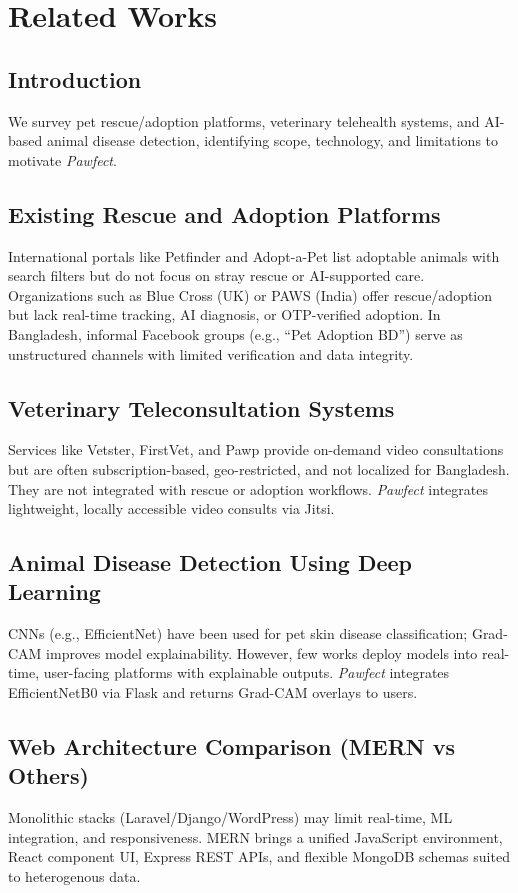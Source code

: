\documentclass[12pt,a4paper]{report}
\numberwithin{figure}{chapter}
\numberwithin{table}{chapter}
\begin{document}
\chapter{Related Works}\label{chap:related}

\section{Introduction}
We survey pet rescue/adoption platforms, veterinary telehealth systems, and AI-based animal disease detection, identifying scope, technology, and limitations to motivate \textit{Pawfect}.

\section{Existing Rescue and Adoption Platforms}
International portals like Petfinder and Adopt-a-Pet list adoptable animals with search filters but do not focus on stray rescue or AI-supported care. Organizations such as Blue Cross (UK) or PAWS (India) offer rescue/adoption but lack real-time tracking, AI diagnosis, or OTP-verified adoption. In Bangladesh, informal Facebook groups (e.g., ``Pet Adoption BD'') serve as unstructured channels with limited verification and data integrity.

\section{Veterinary Teleconsultation Systems}
Services like Vetster, FirstVet, and Pawp provide on-demand video consultations but are often subscription-based, geo-restricted, and not localized for Bangladesh. They are not integrated with rescue or adoption workflows. \textit{Pawfect} integrates lightweight, locally accessible video consults via Jitsi.

\section{Animal Disease Detection Using Deep Learning}
CNNs (e.g., EfficientNet) have been used for pet skin disease classification; Grad-CAM improves model explainability. However, few works deploy models into real-time, user-facing platforms with explainable outputs. \textit{Pawfect} integrates EfficientNetB0 via Flask and returns Grad-CAM overlays to users.

\section{Web Architecture Comparison (MERN vs Others)}
Monolithic stacks (Laravel/Django/WordPress) may limit real-time, ML integration, and responsiveness. MERN brings a unified JavaScript environment, React component UI, Express REST APIs, and flexible MongoDB schemas suited to heterogenous data.
\end{document}
